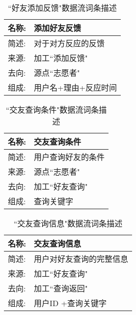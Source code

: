 \begin{table}[H]  
\caption{``好友添加反馈"数据流词条描述}  
\begin{center}  
    \begin{tabular}{l p{11cm}} 
        \hline
        \quad 名称:  &   添加好友反馈 \\
        \hline
        \quad 简述:  & 对于对方反应的反馈 \\
        \hline
        \quad 来源:  & 加工``添加反馈" \\
        \hline
        \quad 去向:  & 源点``志愿者" \\
        \hline
        \quad 组成:  & 用户名+理由+反应时间 \\
        \hline
    \end{tabular}
    \label{tab1}
\end{center}
\end{table}

\begin{table}[H]  
\caption{``交友查询条件"数据流词条描述}  
\begin{center}  
    \begin{tabular}{l p{11cm}} 
        \hline
        \quad 名称:  &  交友查询条件 \\
        \hline
        \quad 简述:  & 用户查询好友的条件 \\
        \hline
        \quad 来源:  & 源点``志愿者"\\
        \hline
        \quad 去向:  & 加工``好友查询" \\
        \hline
        \quad 组成:  & 查询关键字\\
        \hline
    \end{tabular}
    \label{tab1}
\end{center}
\end{table}

\begin{table}[H]  
\caption{``交友查询信息"数据流词条描述}  
\begin{center}  
    \begin{tabular}{l p{11cm}} 
        \hline
        \quad 名称:  &   交友查询信息 \\
        \hline
        \quad 简述:  & 用户对好友查询的完整信息 \\
        \hline
        \quad 来源:  & 加工``好友查询"\\
        \hline
        \quad 去向:  & 加工``查询返回" \\
        \hline
        \quad 组成:  & 用户ID +查询关键字\\
        \hline
    \end{tabular}
    \label{tab1}
\end{center}
\end{table}

